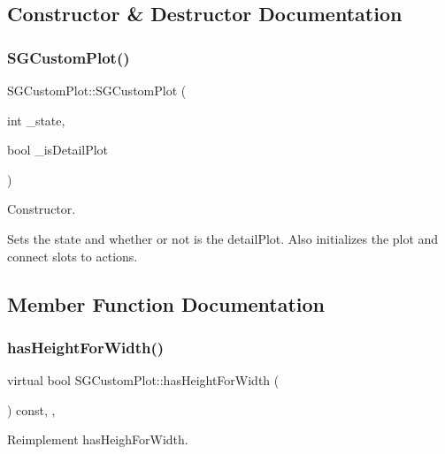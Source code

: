 \subsection{Constructor \& Destructor Documentation}
\mbox{\label{classSGCustomPlot_a95ebb2e31d5aa9bcbd850bb99c5e6d95}} 
\subsubsection{\texorpdfstring{S\+G\+Custom\+Plot()}{SGCustomPlot()}}
{\footnotesize\ttfamily S\+G\+Custom\+Plot\+::\+S\+G\+Custom\+Plot (\begin{DoxyParamCaption}\item[{int}]{\+\_\+state,  }\item[{bool}]{\+\_\+is\+Detail\+Plot }\end{DoxyParamCaption})}



Constructor. 

Sets the state and whether or not is the detail\+Plot. Also initializes the plot and connect slots to actions. 

\subsection{Member Function Documentation}
\mbox{\label{classSGCustomPlot_a560baf18b0aa2e31631c603abfa74d47}} 
\subsubsection{\texorpdfstring{has\+Height\+For\+Width()}{hasHeightForWidth()}}
{\footnotesize\ttfamily virtual bool S\+G\+Custom\+Plot\+::has\+Height\+For\+Width (\begin{DoxyParamCaption}{ }\end{DoxyParamCaption}) const\hspace{0.3cm}{\ttfamily [inline]}, {\ttfamily [private]}, {\ttfamily [virtual]}}



Reimplement has\+Heigh\+For\+Width. 

